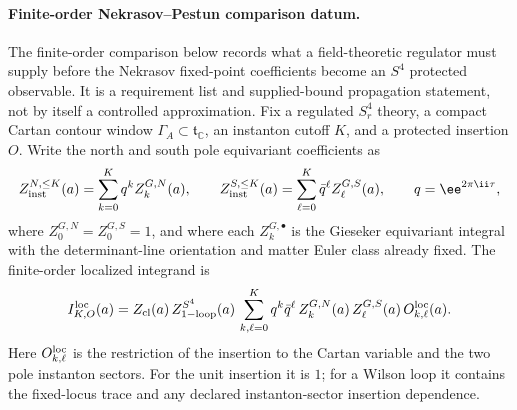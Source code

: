 \paragraph{Finite-order Nekrasov--Pestun comparison datum.}
\label{ca:s4-nekrasov-pestun-normalization-bound}
The finite-order comparison below records what a field-theoretic regulator
must supply before the Nekrasov fixed-point coefficients become an
\(S^4\) protected observable.  It is a requirement list and supplied-bound
propagation statement, not by itself a controlled approximation.  Fix a
regulated \(S^4_r\) theory, a compact Cartan contour window
\(\Gamma_A\subset\mathfrak t_{\mathbb C}\), an instanton cutoff \(K\), and a
protected insertion \(O\).  Write the north and south pole equivariant
coefficients as
\[
  Z_{\rm inst}^{N,\le K}(a)
  =
  \sum_{k=0}^{K}q^k Z_{k}^{G,N}(a),
  \qquad
  Z_{\rm inst}^{S,\le K}(a)
  =
  \sum_{\ell=0}^{K}\bar q^\ell Z_{\ell}^{G,S}(a),
  \qquad q=\ee^{2\pi\ii\tau},
\]
where \(Z_0^{G,N}=Z_0^{G,S}=1\), and where each \(Z_k^{G,\bullet}\) is the
Gieseker equivariant integral with the determinant-line orientation and matter
Euler class already fixed.  The finite-order localized integrand is
\begin{equation}
  I_{K,O}^{\rm loc}(a)
  =
  Z_{\rm cl}(a)\,
  Z_{1{\rm -loop}}^{S^4}(a)\,
  \sum_{k,\ell=0}^{K}
  q^k\bar q^\ell\,
  Z_{k}^{G,N}(a)\,
  Z_{\ell}^{G,S}(a)\,
  O_{k,\ell}^{\rm loc}(a).
  \label{eq:s4-nekrasov-pestun-finite-integrand}
\end{equation}
Here \(O_{k,\ell}^{\rm loc}\) is the restriction of the insertion to the
Cartan variable and the two pole instanton sectors.  For the unit insertion it
is \(1\); for a Wilson loop it contains the fixed-locus trace and any declared
instanton-sector insertion dependence.

